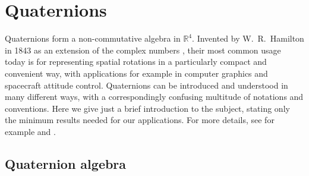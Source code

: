 \documentclass[structabstract]{aa}
\begin{document}

\appendix


\section{Quaternions}\label{sec:quaternions}

Quaternions form a non-commutative algebra in $\mathbb{R}^4$. Invented by
W.~R.~Hamilton in 1843 as an extension of the complex numbers \citep{hamilton1843},
their most common usage today is for representing spatial rotations in a
particularly compact and convenient way, with applications for example in
computer graphics and spacecraft attitude control. Quaternions can be introduced
and understood in many different ways, with a correspondingly confusing multitude
of notations and conventions. Here we give just a brief introduction to the
subject, stating only the minimum results needed for our applications. For
more details, see for example \citet{wertz:1978} and \citet{kane:1983}.


\subsection{Quaternion algebra}\label{sec:quatalg}
\end{document}
